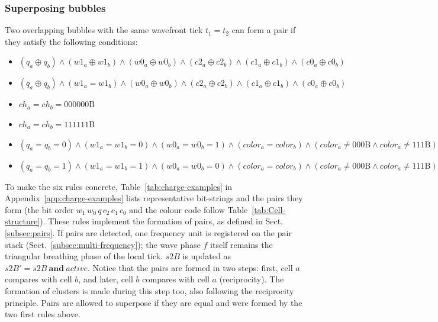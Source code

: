 \documentclass{ijuc}
\begin{document}
\subsubsection{Superposing bubbles}
Two overlapping bubbles with the same wavefront tick $t_1=t_2$ can form a pair if they satisfy the following conditions:
\begin{itemize}
\item
$ (q_a \oplus q_b) \land (w1_a \oplus w1_b) \land (w0_a \oplus w0_b) \land (c2_a \oplus c2_b) \land (c1_a \oplus c1_b) \land (c0_a \oplus c0_b) $
\item
$ (q_a \oplus q_b) \land (w1_a = w1_b) \land (w0_a \oplus w0_b) \land (c2_a \oplus c2_b) \land (c1_a \oplus c1_b) \land (c0_a \oplus c0_b) $
\item
$ ch_a = ch_b = 000000\mathrm{B} $
\item
$ ch_a = ch_b = 111111\mathrm{B} $
\item
$ (q_a = q_b = 0) \land (w1_a = w1_b = 0) \land (w0_a = w0_b = 1) \land (color_a = color_b) \land (color_a \neq 000\mathrm{B} \land color_a \neq 111\mathrm{B}) $
\item
$ (q_a = q_b = 1) \land (w1_a = w1_b = 1) \land (w0_a = w0_b = 0) \land (color_a = color_b) \land (color_a \neq 000\mathrm{B} \land color_a \neq 111\mathrm{B}) $
\end{itemize}
To make the six rules concrete, Table~\ref{tab:charge-examples} in Appendix~\ref{app:charge-examples} lists representative bit-strings and the pairs they form (the bit order $w_{1}\,w_{0}\,q\,c_{2}\,c_{1}\,c_{0}$ and the colour code follow Table~\ref{tab:Cell-structure}).
These rules implement the formation of pairs, as defined in Sect. \ref{subsec:pairs}.
If pairs are detected, one frequency unit is registered on the pair stack (Sect.~\ref{subsec:multi-frequency}); the wave phase $f$ itself remains the triangular breathing phase of the local tick.
$s2B$ is updated as $s2B' = s2B \ \textbf{and} \ \mathit{active}$.
Notice that the pairs are formed in two steps: first, cell $a$ compares with cell $b$, and later, cell $b$ compares with cell $a$ (reciprocity).
The formation of clusters is made during this step too, also following the reciprocity principle.
Pairs are allowed to superpose if they are equal and were formed by the two first rules above.
\end{document}

